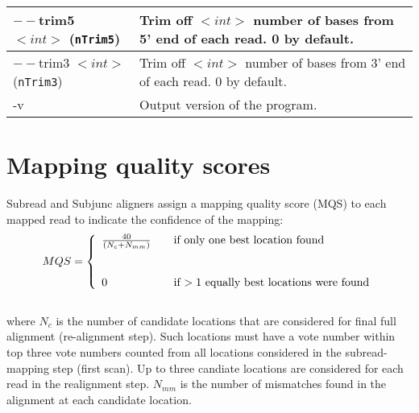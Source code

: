 \documentclass[12pt]{report}
\newcommand{\code}[1]{{\small\texttt{#1}}}
\newcommand{\Subread}{\textsf{Subread}}
\newcommand{\Subjunc}{\textsf{Subjunc}}
\begin{document}
\begin{longtable}{|p{4cm}|p{12cm}|}
\hline
$--$trim5 $<int>$ \newline (\code{nTrim5}) & Trim off $<int>$ number of bases from 5' end of each read. 0 by default.\\
\hline
$--$trim3 $<int>$ \newline (\code{nTrim3}) & Trim off $<int>$ number of bases from 3' end of each read. 0 by default.\\
\hline
-v & Output version of the program. \\
\hline
\end{longtable}

\newpage

\section{Mapping quality scores}

{\Subread} and {\Subjunc} aligners assign a mapping quality score (MQS) to each mapped read to indicate the confidence of the mapping:\\

\[ MQS = \left\{
\begin{array}{l l}
\frac{40}{(N_c + N_{mm})} & \quad \text{if only one best location found}\\
& \\
& \\
0 & \quad \text{if $>1$ equally best locations were found}\\
\end{array} \right.\] \\

\noindent where $N_c$ is the number of candidate locations that are considered for final full alignment (re-alignment step).
Such locations must have a vote number within top three vote numbers counted from all locations considered in the subread-mapping step (first scan).
Up to three candiate locations are considered for each read in the realignment step.
$N_{mm}$ is the number of mismatches found in the alignment at each candidate location.



\end{document}
